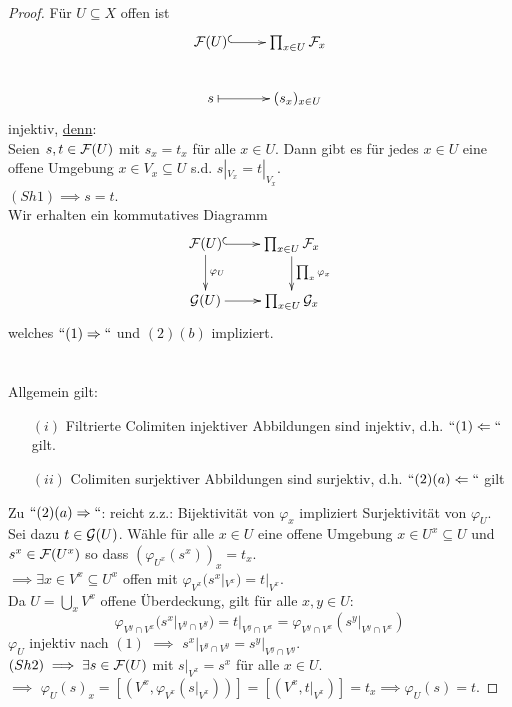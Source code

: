 \begin{proof}
Für $U \subseteq X$ offen ist
\[
\xymatrix{
  \sheaf{F}(U) \ar@{^{(}->}[r] & \prod_{x \in U} \sheaf{F}_{x}\\
  s \ar@{|->}[r] & (s_{x})_{x \in U}
}
\] injektiv, \underline{denn}:\\
Seien $s,t \in \mathcal{F}(U)$ mit $s_x = t_x$ für alle $x \in U$. Dann gibt es für jedes $x \in U$ eine offene Umgebung $x \in V_x \subseteq U$ s.d. $s|_{V_x} = t|_{V_x}$.\\
$(Sh1) \implies s = t$.\\
Wir erhalten ein kommutatives Diagramm \\
\[
\xymatrix
{
\sheaf{F}(U) \ar@{^{(}->}[r] \ar^{\varphi_U}@{->}[d] & \prod_{x \in U} \sheaf{F}_{x} \ar^{\prod_{x}\varphi_x}@{->}[d] \\
\sheaf{G}(U) \ar@{->}[r] & \prod_{x \in U} \sheaf{G}_{x}
}
\] welches $``(1) \Rightarrow``$ und $(2)(b)$ impliziert.\\
\\
\\
Allgemein gilt: 
\begin{enumerate}
	\item[$(i)$] Filtrierte Colimiten injektiver Abbildungen sind injektiv, d.h. $``(1) \Leftarrow ``$ gilt.
    \item[$(ii)$] Colimiten surjektiver Abbildungen sind surjektiv, d.h. $``(2)(a)\Leftarrow ``$ gilt
\end{enumerate}
Zu $``(2)(a)\Rightarrow ``$: reicht z.z.: Bijektivität von $\varphi_x$ impliziert Surjektivität von $\varphi_U$.\\
Sei dazu $t \in \mathcal{G}(U)$. Wähle für alle $x \in U$ eine offene Umgebung $x \in U^{x} \subseteq U$ und $s^{x} \in \mathcal{F}(U^x)$ so dass $(\varphi_{U^x}(s^x))_x = t_x$.\\
$\implies \exists x \in V^x \subseteq U^x$ offen mit $\varphi_{V^x}(s^x|_{V^x}) = t|_{V^x}$. \\
Da $U = \bigcup_x{V^x}$ offene Überdeckung, gilt für alle $x,y \in U$:\\
\[
\varphi_{V^y \cap V^x}(s^x|_{V^y \cap V^y}) = t|_{V^y \cap V^x} = \varphi_{V^y \cap V^x}(s^y|_{V^y \cap V^x})
\]
$\varphi_{U}$ injektiv nach $(1)$ $\implies$ $s^x|_{V^y \cap V^y} = s^y|_{V^y \cap V^y}$.\\
$(Sh2) \implies \exists s \in \mathcal{F}(U)$ mit $s|_{V^x} = s^x$ für alle $x \in U$. \\
$\implies$ $\varphi_U(s)_x = [(V^x, \varphi_{V^x}(s|_{V^x}))] = [(V^x, t|_{V^x})] = t_x \implies \varphi_{U}(s) = t$.
\end{proof}

